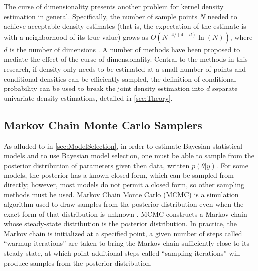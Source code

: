 \documentclass[twocolumn]{article}
\begin{document}
The curse of dimensionality presents another problem for kernel density estimation in general. Specifically, the number of sample points $N$ needed to achieve acceptable density estimates (that is, the expectation of the estimate is with a neighborhood of its true value) grows as $O\left(N^{-4/(4+d)}\ln(N)\right)$, where $d$ is the number of dimensions \citep{LiuLafferty}. A number of methods have been proposed to mediate the effect of the curse of dimensionality. Central to the methods in this research, if density only needs to be estimated at a small number of points and conditional densities can be efficiently sampled, the definition of conditional probability can be used to break the joint density estimation into $d$ separate univariate density estimations, detailed in \cref{sec:Theory}.

\subsection{Markov Chain Monte Carlo Samplers}

As alluded to in \cref{sec:ModelSelection}, in order to estimate Bayesian statistical models and to use Bayesian model selection, one must be able to sample from the posterior distribution of parameters given then data, written $p(\theta|y)$. For some models, the posterior has a known closed form, which can be sampled from directly; however, most models do not permit a closed form, so other sampling methods must be used. Markov Chain Monte Carlo (MCMC) is a simulation algorithm used to draw samples from the posterior distribution even when the exact form of that distribution is unknown \citep{GelfandSmith}. MCMC constructs a Markov chain whose steady-state distribution is the posterior distribution. In practice, the Markov chain is initialized at a specified point, a given number of steps called ``warmup iterations'' are taken to bring the Markov chain sufficiently close to its steady-state, at which point additional steps called ``sampling iterations'' will produce samples from the posterior distribution.
\end{document}
